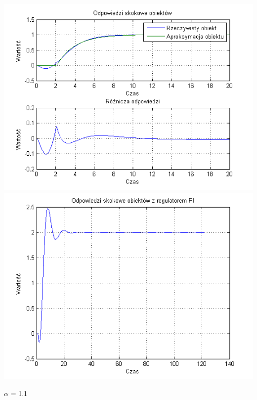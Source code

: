 \documentclass[10pt,a4paper]{article}
\begin{document}
\begin{center}
\includegraphics[scale=1]{images/jeden/skrypt_243.png}\\
\includegraphics[scale=1]{images/jeden/skrypt_244.png}\\
\end{center}
\newpage
$\alpha$ = 1.1
\end{document}
